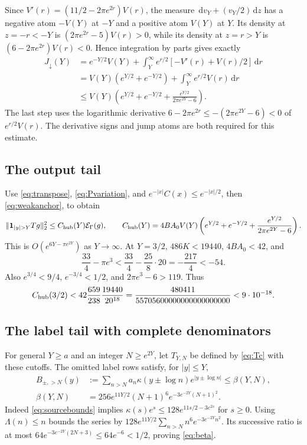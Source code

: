 \documentclass[11pt]{article}
\theoremstyle{remark}\newtheorem{remark}[theorem]{Remark}
\newcommand{\E}{\mathcal E}
\newcommand{\dd}{\,\mathrm d}
\newcommand{\norm}[1]{\lVert #1\rVert}
\numberwithin{equation}{section}
\begin{document}
Since $V'(r)=(11/2-2\pi e^{2r})V(r)$, the measure
$\dd v_Y+(v_Y/2)\dd z$ has a negative atom $-V(Y)$ at $-Y$ and a positive atom $V(Y)$ at $Y$. Its density at $z=-r<-Y$ is
$(2\pi e^{2r}-5)V(r)>0$, while its density at $z=r>Y$ is
$(6-2\pi e^{2r})V(r)<0$. Hence integration by parts gives exactly
\begin{align}
 J_\downarrow(Y)
 &=e^{-Y/2}V(Y)+\int_Y^\infty e^{r/2}[-V'(r)+V(r)/2]\dd r\nonumber\\
 &=V(Y)(e^{Y/2}+e^{-Y/2})+\int_Y^\infty e^{r/2}V(r)\dd r\nonumber\\
 &\le V(Y)\left(e^{Y/2}+e^{-Y/2}
                    +\frac{e^{Y/2}}{2\pi e^{2Y}-6}\right).\label{eq:J}
\end{align}
The last step uses the logarithmic derivative
$6-2\pi e^{2r}\le-(2\pi e^{2Y}-6)<0$ of $e^{r/2}V(r)$.
The derivative signs and jump atoms are both required for this estimate.

\subsection{The output tail}
Use \eqref{eq:transpose}, \eqref{eq:Pvariation}, and
$e^{-|x|}C(x)\le e^{-|x|/2}$, then \eqref{eq:weakanchor}, to obtain
\begin{equation}\label{eq:hubtail}
 \norm{\mathbf1_{|y|>Y}Tg}_2^2
 \le C_{\rm hub}(Y)\E_\Gamma(g),\qquad
 C_{\rm hub}(Y)=4BA_0V(Y)
 \left(e^{Y/2}+e^{-Y/2}+\frac{e^{Y/2}}{2\pi e^{2Y}-6}\right).
\end{equation}
This is $O(e^{6Y-\pi e^{2Y}})$ as $Y\to\infty$.
At $Y=3/2$, $486K<19440$, $4BA_0<42$, and
\[
 \frac{33}{4}-\pi e^3<\frac{33}{4}-\frac{25}{8}\cdot20
 =-\frac{217}{4}<-54.
\]
Also $e^{3/4}<9/4$, $e^{-3/4}<1/2$, and $2\pi e^3-6>119$.
Thus
\begin{equation}\label{eq:hubnumber}
 C_{\rm hub}(3/2)
 <42\frac{659}{238}\frac{19440}{20^{18}}
 =\frac{480411}{55705600000000000000000}
 <9\cdot10^{-18}.
\end{equation}

\subsection{The label tail with complete denominators}
For general $Y\ge a$ and an integer $N\ge e^{2Y}$, let $T_{Y,N}$ be defined by \eqref{eq:Tc} with these cutoffs. The omitted label rows satisfy, for $|y|\le Y$,
\begin{align}
 B_{\pm,>N}(y)
 &:=\sum_{n>N}a_n\kappa(y\pm\log n)e^{|y\pm\log n|}
 \le\beta(Y,N),\nonumber\\
 \beta(Y,N)&=256e^{11Y/2}(N+1)^6
                   e^{-3e^{-2Y}(N+1)^2}.\label{eq:beta}
\end{align}
Indeed \eqref{eq:sourcebounds} implies
$\kappa(s)e^s\le128e^{11s/2-3e^{2s}}$ for $s\ge0$.
Using $\Lambda(n)\le n$ bounds the series by
$128e^{11Y/2}\sum_{n>N}n^6e^{-3e^{-2Y}n^2}$.
Its successive ratio is at most
$64e^{-3e^{-2Y}(2N+3)}\le64e^{-6}<1/2$, proving \eqref{eq:beta}.
\end{document}
